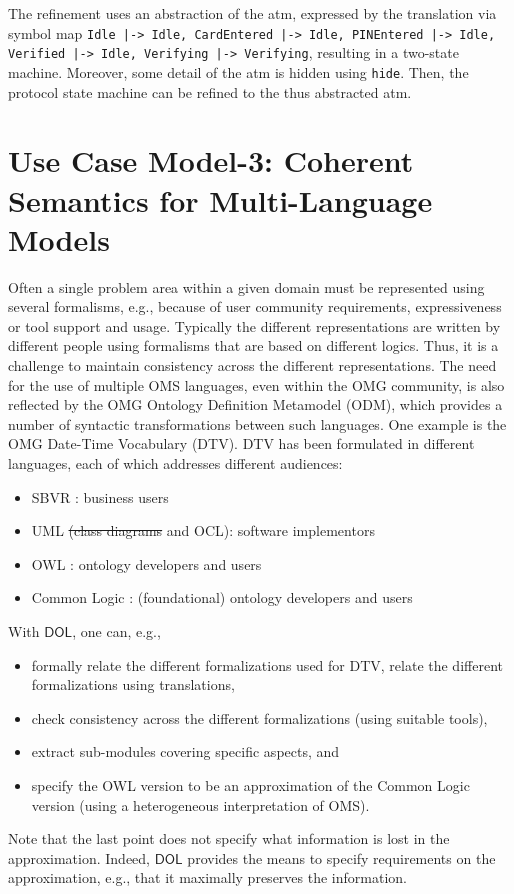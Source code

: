 \documentclass[10pt,fleqn,final]{scrreprt}
\newcommand*{\syntax}[1]{\texttt{#1}}
\newcommand*{\DOL}{\ensuremath{\mathsf{DOL}}\xspace}
\newcommand{\noterefname}{note}
\newcommand{\nref}[1]{\noterefname~\ref{#1}}
\renewcommand{\nref}[1]{\ref{nref-#1}} %
\newenvironment{definitions}[0]{\medskip }{}
\newcommand{\uml}[1]{\textsf{#1}}
\providecommand{\DIFadd}[1]{{\protect\color{blue}\uwave{#1}}} %
\providecommand{\DIFdel}[1]{{\protect\color{red}\sout{#1}}}                      %
\providecommand{\DIFaddbegin}{} %
\providecommand{\DIFaddend}{} %
\providecommand{\DIFdelbegin}{} %
\providecommand{\DIFdelend}{} %
\begin{document}
\begin{definitions}
The refinement uses an abstraction of the \uml{atm}, expressed by the
translation via symbol map \texttt{Idle |-> Idle, CardEntered |-> Idle, PINEntered |-> Idle, Verified |-> Idle, Verifying |-> Verifying}, resulting in a two-state machine. Moreover, some detail of the \uml{atm} is hidden using
\syntax{hide}. Then, the protocol state machine can be refined to
the thus abstracted \uml{atm}.

\section{Use Case Model-3: Coherent Semantics for Multi-Language Models}
\label{model-3}

Often a single problem area within a given domain must be represented using several formalisms, e.g., because of user community requirements, expressiveness or tool support 
and usage. 
Typically the different representations are written by different people using formalisms that are based on different logics. Thus, it is a challenge to maintain 
consistency across the different representations. 
The need for the use of multiple OMS languages, even within the OMG community, is also reflected by the OMG Ontology Definition Metamodel (ODM\DIFaddbegin \DIFadd{, \nref{ODM}}\DIFaddend ), which 
provides a number of syntactic transformations between such languages.
One example is the OMG Date-Time Vocabulary (DTV\DIFaddbegin \DIFadd{, \nref{DTV}}\DIFaddend ). DTV has been formulated in different languages, each of which addresses different audiences:
\begin{itemize}
\item	 SBVR \DIFaddbegin \DIFadd{\nref{SBVR}}\DIFaddend : business users
\item 	UML \DIFdelbegin \DIFdel{(class diagrams }\DIFdelend \DIFaddbegin \DIFadd{\nref{UML} (class models }\DIFaddend and OCL): software implementors
\item 	OWL \DIFaddbegin \DIFadd{\nref{OWL2}}\DIFaddend : ontology developers and users
\item 	Common Logic \DIFaddbegin \DIFadd{\nref{CL}}\DIFaddend : (foundational) ontology developers and users
\end{itemize}
With \DOL, one can, e.g.,
\begin{itemize}
\item 	formally relate the different formalizations used for DTV, relate the different formalizations using translations,
\item 	check consistency across the different formalizations (using suitable tools),
\item 	extract sub-modules covering specific aspects, and
\item 	specify the OWL version to be an approximation of the Common Logic version (using a heterogeneous interpretation of OMS).
\end{itemize}
Note that the last point does not specify what information is lost in the approximation. Indeed, \DOL provides the means to specify requirements on the approximation, e.g., that it maximally preserves the information. 


\end{definitions}
\end{document}
